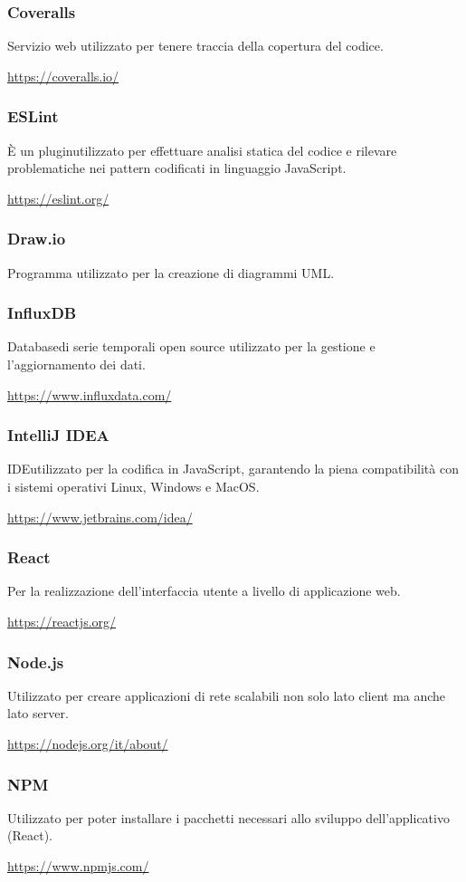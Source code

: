 	\subsubsection{Coveralls}
	Servizio web utilizzato per tenere traccia della copertura del codice.\\
	\centerline{\url{https://coveralls.io/}}
	\subsubsection{ESLint}
	È un plugin\glo utilizzato per effettuare analisi statica del codice e rilevare problematiche nei pattern codificati in linguaggio JavaScript\glo. \\
	\centerline{\url{https://eslint.org/}}
	\subsubsection{Draw.io}
	Programma utilizzato per la creazione di diagrammi UML.
	\subsubsection{InfluxDB}
	Database\glo di serie temporali open source utilizzato per la gestione e l'aggiornamento dei dati.\\
	\centerline{\url{https://www.influxdata.com/}}
	\subsubsection{IntelliJ IDEA}
	IDE\glo utilizzato per la codifica in JavaScript, garantendo la piena compatibilità con i sistemi operativi Linux, Windows e MacOS.\\
	\centerline{\url{https://www.jetbrains.com/idea/}}
	\subsubsection{React}
	Per la realizzazione dell’interfaccia utente a livello di applicazione web.\\
	\centerline{\url{https://reactjs.org/}}
	\subsubsection{Node.js}
	Utilizzato per creare applicazioni di rete scalabili non solo lato client ma anche lato server.
	\\
	\centerline{\url{https://nodejs.org/it/about/}}
	\subsubsection{NPM}
	Utilizzato per poter installare i pacchetti necessari allo sviluppo dell’applicativo (React\glo).
	\\
	\centerline{\url{https://www.npmjs.com/}}
